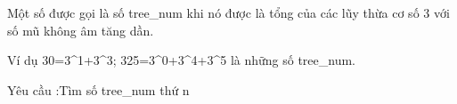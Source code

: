 Một số được gọi là số tree\_num khi nó được là tổng của các lũy thừa cơ số 3 với số mũ không âm tăng dần.

Ví dụ 30=3^1+3^3; 325=3^0+3^4+3^5 là những số tree\_num.

Yêu cầu :Tìm số tree\_num thứ n